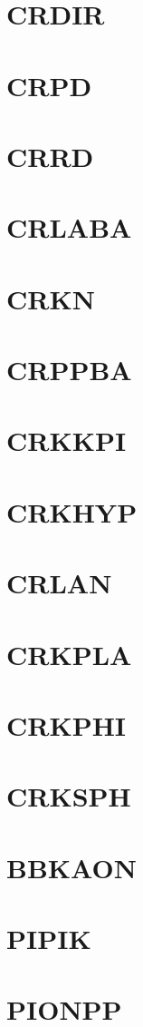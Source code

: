 \documentclass[14pt,UTF8]{ctexbook}
\begin{document}
\section{CRDIR}
\section{CRPD}
\section{CRRD}
\section{CRLABA}
\section{CRKN}
\section{CRPPBA}
\section{CRKKPI}
\section{CRKHYP}
\section{CRLAN}
\section{CRKPLA}
\section{CRKPHI}
\section{CRKSPH}
\section{BBKAON}
\section{PIPIK}
\section{PIONPP}
\end{document}
